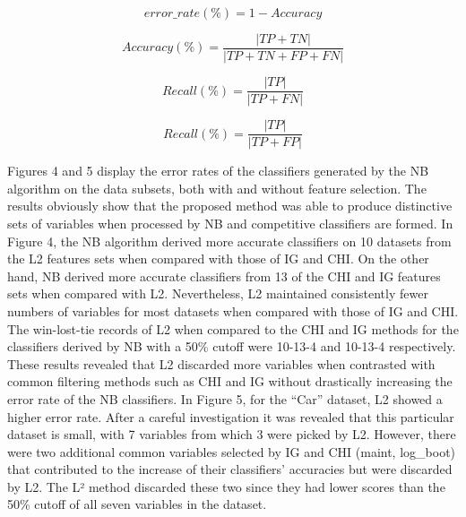 \documentclass[review]{elsarticle}
\begin{document}
\begin{equation}\label{eq:8}
error\_rate(\%) = 1- Accuracy
\end{equation}


\begin{equation}\label{eq:9}
Accuracy(\%) = \frac{|TP + TN|}{|TP + TN + FP + FN|}
\end{equation}

\begin{equation}\label{eq:10}
Recall(\%) = \frac{|TP|}{|TP + FN|} 
\end{equation}


\begin{equation}\label{eq:11}
Recall(\%) = \frac{|TP|}{|TP + FP|} 
\end{equation}

Figures 4 and 5 display the error rates of the classifiers generated by the NB algorithm on the data subsets, both with and without feature selection. The results obviously show that the proposed method was able to produce distinctive sets of variables when processed by NB and competitive classifiers are formed. In Figure 4, the NB algorithm derived more accurate classifiers on 10 datasets from the L2 features sets when compared with those of IG and CHI. On the other hand, NB derived more accurate classifiers from 13 of the CHI and IG features sets when compared with L2. Nevertheless, L2 maintained consistently fewer numbers of variables for most datasets when compared with those of IG and CHI. The win-lost-tie records of L2 when compared to the CHI and IG methods for the classifiers derived by NB with a 50\% cutoff were 10-13-4 and 10-13-4 respectively. These results revealed that L2 discarded more variables when contrasted with common filtering methods such as CHI and IG without drastically increasing the error rate of the NB classifiers. In Figure 5, for the “Car” dataset, L2 showed a higher error rate. After a careful investigation it was revealed that this particular dataset is small, with 7 variables from which 3 were picked by L2. However, there were two additional common variables selected by IG and CHI (maint, log\_boot) that contributed to the increase of their classifiers’ accuracies but were discarded by L2. The L² method discarded these two since they had lower scores than the 50\% cutoff of all seven variables in the dataset. 
\end{document}
